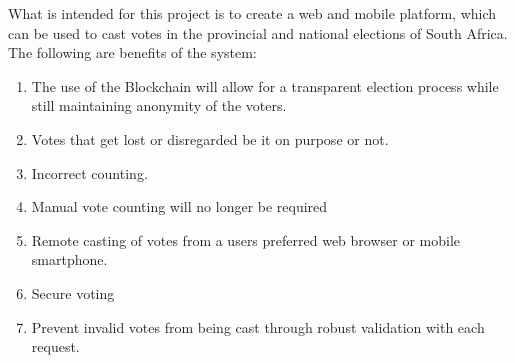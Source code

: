 What is intended for this project is to create a web and mobile platform, which can be used to cast votes in the provincial and national elections of South Africa. The following are benefits of the system:
	
	\begin{enumerate}
		\item The use of the Blockchain will allow for a transparent election process while still maintaining anonymity of the voters. 
		\item Votes that get lost or disregarded be it on purpose or not.
		\item Incorrect counting.
		\item Manual vote counting will no longer be required
		\item Remote casting of votes from a users preferred web browser or mobile smartphone. 
		\item Secure voting
		\item Prevent invalid votes from being cast through robust validation with each request.
	\end{enumerate}
